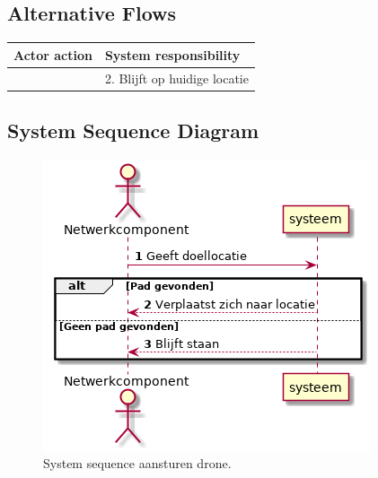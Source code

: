 \documentclass[a4paper, 11pt, oneside]{report}
\begin{document}
\subsection{Alternative Flows}


\begin{table}[H]
	\centering
	\begin{tabular}{|l|l|}
		\hline
		\rowcolor[HTML]{C0C0C0} 
		Actor action  & System responsibility   \\ \hline
				      & 2. Blijft op huidige locatie                        \\ \hline
	\end{tabular}
\end{table}


\subsection{System Sequence Diagram }
\label{Usecase:aansturendrone:systemsequence}


\begin{figure}[H]
	\begin{center}\includegraphics[height=.25\textheight]{UML/out/usecase/sequence/aansturendrone/aansturendrone.png}\end{center}
	\caption{System sequence aansturen drone.}
	\label{fig:aansturendrone:systemsequence}
\end{figure}
\end{document}
